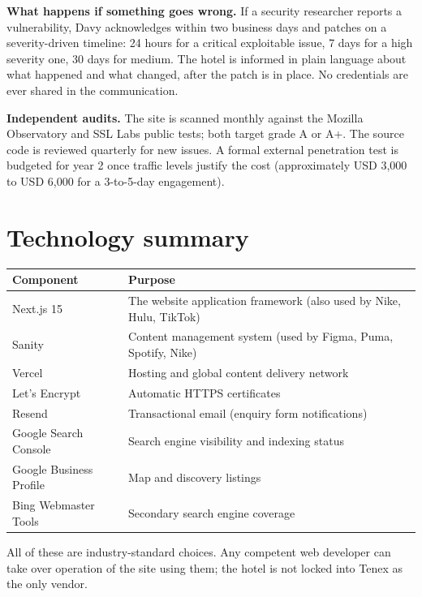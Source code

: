 \documentclass[11pt,a4paper]{article}
\begin{document}
\textbf{What happens if something goes wrong.} If a security researcher reports a vulnerability, Davy acknowledges within two business days and patches on a severity-driven timeline: 24 hours for a critical exploitable issue, 7 days for a high severity one, 30 days for medium. The hotel is informed in plain language about what happened and what changed, after the patch is in place. No credentials are ever shared in the communication.

\textbf{Independent audits.} The site is scanned monthly against the Mozilla Observatory and SSL Labs public tests; both target grade A or A+. The source code is reviewed quarterly for new issues. A formal external penetration test is budgeted for year 2 once traffic levels justify the cost (approximately USD 3{,}000 to USD 6{,}000 for a 3-to-5-day engagement).

\section{Technology summary}

\begin{tabularx}{\textwidth}{@{} l X @{}}
\toprule
\textbf{Component} & \textbf{Purpose} \\
\midrule
Next.js 15 & The website application framework (also used by Nike, Hulu, TikTok) \\
Sanity & Content management system (used by Figma, Puma, Spotify, Nike) \\
Vercel & Hosting and global content delivery network \\
Let's Encrypt & Automatic HTTPS certificates \\
Resend & Transactional email (enquiry form notifications) \\
Google Search Console & Search engine visibility and indexing status \\
Google Business Profile & Map and discovery listings \\
Bing Webmaster Tools & Secondary search engine coverage \\
\bottomrule
\end{tabularx}

All of these are industry-standard choices. Any competent web developer can take over operation of the site using them; the hotel is not locked into Tenex as the only vendor.

\end{document}

